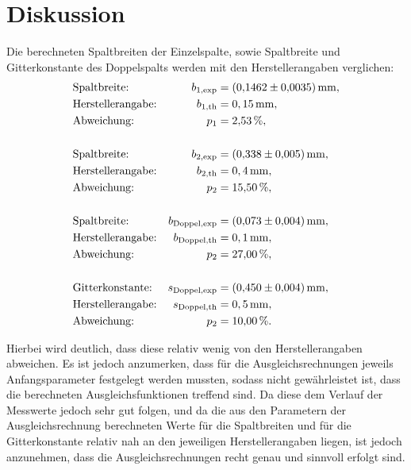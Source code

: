 \section{Diskussion}
\label{sec:Diskussion}

Die berechneten Spaltbreiten der Einzelspalte, sowie Spaltbreite und Gitterkonstante des
Doppelspalts werden mit den Herstellerangaben verglichen:
\begin{align*}
  &\text{Spaltbreite:} & b_\text{1,exp} &= (\num{0.1462 +- 0.0035})\,\si{\milli\meter}, \\
  &\text{Herstellerangabe:} & b_\text{1,th} &= 0,15\,\si{\milli\meter}, \\
  &\text{Abweichung:} & p_1 &= \num{2,53}\,\%,\\ \\
  &\text{Spaltbreite:} & b_\text{2,exp} &= (\num{0.338 +- 0.005}) \,\si{\milli\meter}, \\
  &\text{Herstellerangabe:} & b_\text{2,th} &= 0,4\,\si{\milli\meter}, \\
  &\text{Abweichung:} & p_2 &= \num{15,50}\,\%, \\ \\
  &\text{Spaltbreite:} & b_\text{Doppel,exp} &= (\num{0.073 +-0.004})\,\si{\milli\meter},\\
  &\text{Herstellerangabe:} & b_\text{Doppel,th} &= 0,1\,\si{\milli\meter}, \\
  &\text{Abweichung:} & p_2 &= \num{27,00}\,\%, \\ \\
  &\text{Gitterkonstante:} & s_\text{Doppel,exp} &= (\num{0.450 +- 0.004}) \,\si{\milli\meter}, \\
  &\text{Herstellerangabe:} & s_\text{Doppel,th} &= 0,5\,\si{\milli\meter}, \\
  &\text{Abweichung:} & p_2 &= \num{10,00}\,\%.
\end{align*}

Hierbei wird deutlich, dass diese relativ wenig von den Herstellerangaben abweichen.
Es ist jedoch anzumerken, dass für die Ausgleichsrechnungen jeweils Anfangsparameter festgelegt
werden mussten, sodass nicht gewährleistet ist, dass die berechneten Ausgleichsfunktionen
treffend sind. Da diese dem Verlauf der Messwerte jedoch sehr gut folgen, und da
die aus den Parametern der Ausgleichsrechnung berechneten Werte für die Spaltbreiten und für die Gitterkonstante
relativ nah an den jeweiligen Herstellerangaben liegen, ist jedoch
anzunehmen, dass die Ausgleichsrechnungen recht genau und sinnvoll erfolgt sind.

